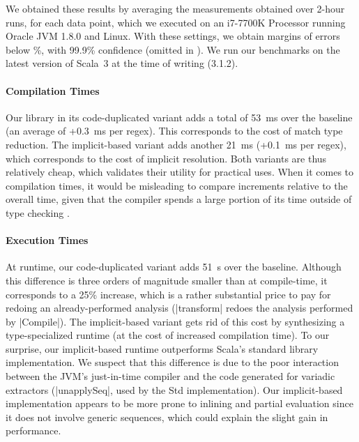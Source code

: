 
We obtained these results by averaging the measurements obtained over 2-hour runs, for each data point, which we executed on an i7-7700K Processor running Oracle JVM 1.8.0 and Linux.
With these settings, we obtain margins of errors below \%, with 99.9\% confidence (omitted in ).
We run our benchmarks on the latest version of Scala~3 at the time of writing (3.1.2).

\paragraph{Compilation Times} Our library in its code-duplicated variant adds a total of 53~ms over the baseline (an average of +0.3~ms per regex).
This corresponds to the cost of match type reduction.
The implicit-based variant adds another 21~ms (+0.1~ms per regex), which corresponds to the cost of implicit resolution.
Both variants are thus relatively cheap, which validates their utility for practical uses.
When it comes to compilation times, it would be misleading to compare increments relative to the overall time, given that the compiler spends a large portion of its time outside of type checking \citep[§ 2.11.3]{petrashko2017design}.

\paragraph{Execution Times} At runtime, our code-duplicated variant adds 51~\textmu s over the baseline.
Although this difference is three orders of magnitude smaller than at compile-time, it corresponds to a 25\% increase, which is a rather substantial price to pay for redoing an already-performed analysis (|transform| redoes the analysis performed by |Compile|).
The implicit-based variant gets rid of this cost by synthesizing a type-specialized runtime (at the cost of increased compilation time).
To our surprise, our implicit-based runtime outperforms Scala's standard library implementation.
We suspect that this difference is due to the poor interaction between the JVM's just-in-time compiler and the code generated for variadic extractors (|unapplySeq|, used by the Std implementation).
Our implicit-based implementation appears to be more prone to inlining and partial evaluation since it does not involve generic sequences, which could explain the slight gain in performance.

